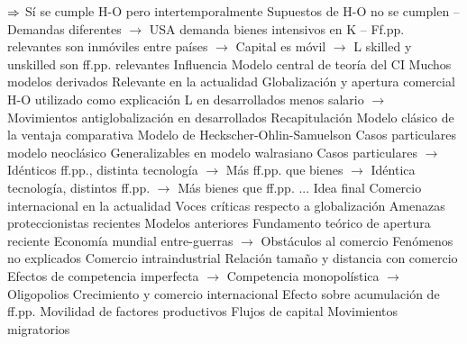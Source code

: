 \documentclass{nuevotema}
\begin{document}
\begin{esquemal}
				\4[] $\then$ Sí se cumple H-O pero intertemporalmente
				\4[II] Supuestos de H-O no se cumplen
				\4[] -- Demandas diferentes
				\4[] $\to$ USA demanda bienes intensivos en K
				\4[] -- Ff.pp. relevantes son inmóviles entre países
				\4[] $\to$ Capital es móvil
				\4[] $\to$ L skilled y unskilled son ff.pp. relevantes
			\3 Influencia
				\4 Modelo central de teoría del CI
				\4[] Muchos modelos derivados
				\4[] Relevante en la actualidad
				\4 Globalización y apertura comercial
				\4[] H-O utilizado como explicación
				\4[] L en desarrollados menos salario
				\4[] $\to$ Movimientos antiglobalización en desarrollados
	\1[] 
		\2 Recapitulación
			\3 Modelo clásico de la ventaja comparativa
			\3 Modelo de Heckscher-Ohlin-Samuelson
			\3[$\then$] Casos particulares modelo neoclásico
				\4 Generalizables en modelo walrasiano
				\4[] Casos particulares
				\4[] $\to$ Idénticos ff.pp., distinta tecnología
				\4[] $\to$ Más ff.pp. que bienes
				\4[] $\to$ Idéntica tecnología, distintos ff.pp.
				\4[] $\to$ Más bienes que ff.pp.
				\4[] ...
		\2 Idea final
			\3 Comercio internacional en la actualidad
				\4 Voces críticas respecto a globalización
				\4 Amenazas proteccionistas recientes
				\4 Modelos anteriores
				\4[] Fundamento teórico de apertura reciente
				\4[] Economía mundial entre-guerras
				\4[] $\to$ Obstáculos al comercio
			\3 Fenómenos no explicados
				\4 Comercio intraindustrial
				\4 Relación tamaño y distancia con comercio
				\4 Efectos de competencia imperfecta
				\4[] $\to$ Competencia monopolística
				\4[] $\to$ Oligopolios
				\4 Crecimiento y comercio internacional
				\4[] Efecto sobre acumulación de ff.pp.
				\4 Movilidad de factores productivos
				\4[] Flujos de capital
				\4[] Movimientos migratorios
\end{esquemal}





























\graficas
\end{document}
